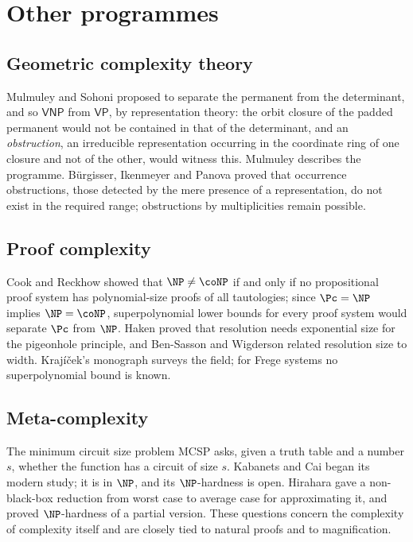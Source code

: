\section{Other programmes}\label{sec:otherroutes}

\subsection{Geometric complexity theory}
Mulmuley and Sohoni \cite{MS01} proposed to separate the permanent from the
determinant, and so $\mathsf{VNP}$ from $\mathsf{VP}$, by representation
theory: the orbit closure of the padded permanent would not be contained in
that of the determinant, and an \emph{obstruction}, an irreducible
representation occurring in the coordinate ring of one closure and not of the
other, would witness this. Mulmuley \cite{Mul12} describes the programme.
B\"urgisser, Ikenmeyer and Panova \cite{BIP19} proved that occurrence
obstructions, those detected by the mere presence of a representation, do not
exist in the required range; obstructions by multiplicities remain possible.

\subsection{Proof complexity}
Cook and Reckhow \cite{CR79} showed that $\NP\ne\coNP$ if and only if no
propositional proof system has polynomial-size proofs of all tautologies; since
$\Pc=\NP$ implies $\NP=\coNP$, superpolynomial lower bounds for every proof
system would separate $\Pc$ from $\NP$. Haken \cite{Hak85} proved that
resolution needs exponential size for the pigeonhole principle, and
Ben-Sasson and Wigderson \cite{BSW01} related resolution size to width.
Kraj\'i\v{c}ek's monograph \cite{Kra19} surveys the field; for Frege systems
no superpolynomial bound is known.

\subsection{Meta-complexity}
The minimum circuit size problem MCSP asks, given a truth table and a number
$s$, whether the function has a circuit of size $s$. Kabanets and Cai
\cite{KC00} began its modern study; it is in $\NP$, and its $\NP$-hardness is open.
Hirahara \cite{Hir18} gave a non-black-box reduction from worst case to average
case for approximating it, and \cite{Hir22} proved $\NP$-hardness of a partial
version. These questions concern the complexity of complexity itself and are
closely tied to natural proofs and to magnification.

